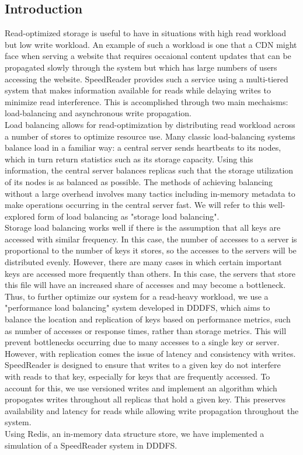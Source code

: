 \documentclass[twoside]{article}
\begin{document}
\begin{multicols}{2} %

\section{Introduction}

Read-optimized storage is useful to have in situations with high read workload but low write workload. An example of such a workload is one that a CDN might face when serving a website that requires occaional content updates that can be propagated slowly through the system but which has large numbers of users accessing the website. SpeedReader provides such a service using a multi-tiered system that makes information available for reads while delaying writes to minimize read interference. This is accomplished through two main mechaisms: load-balancing and asynchronous write propagation.\\\indent
Load balancing allows for read-optimization by distributing read workload across a number of stores to optimize resource use. Many classic load-balancing systems balance load in a familiar way: a central server sends heartbeats to its nodes, which in turn return statistics such as its storage capacity.  Using this information, the central server balances replicas such that the storage utilization of its nodes is as balanced as possible. The methods of achieving balancing without a large overhead involves many tactics including in-memory metadata to make operations occurring in the central server fast. We will refer to this well-explored form of load balancing as "storage load balancing".\\\indent
Storage load balancing works well if there is the assumption that all keys are accessed with similar frequency. In this case, the number of accesses to a server is proportional to the number of keys it stores, so the accesses to the servers will be distributed evenly. However, there are many cases in which certain important keys are accessed more frequently than others. In this case, the servers that store this file will have an increased share of accesses and may become a bottleneck. Thus, to further optimize our system for a read-heavy workload, we use a "performance load balancing" system developed in DDDFS, which aims to balance the location and replication of keys based on performance metrics, such as number of accesses or response times, rather than storage metrics. This will prevent bottlenecks occurring due to many accesses to a single key or server. \\\indent
However, with replication comes the issue of latency and consistency with writes. SpeedReader is designed to ensure that writes to a given key do not interfere with reads to that key, especially for keys that are frequently accessed. To account for this, we use versioned writes and implement an algorithm which propogates writes throughout all replicas that hold a given key. This preserves availability and latency for reads while allowing write propagation throughout the system.\\\indent
Using Redis, an in-memory data structure store, we have implemented a simulation of a SpeedReader system in DDDFS. 


\end{multicols}
\end{document}
